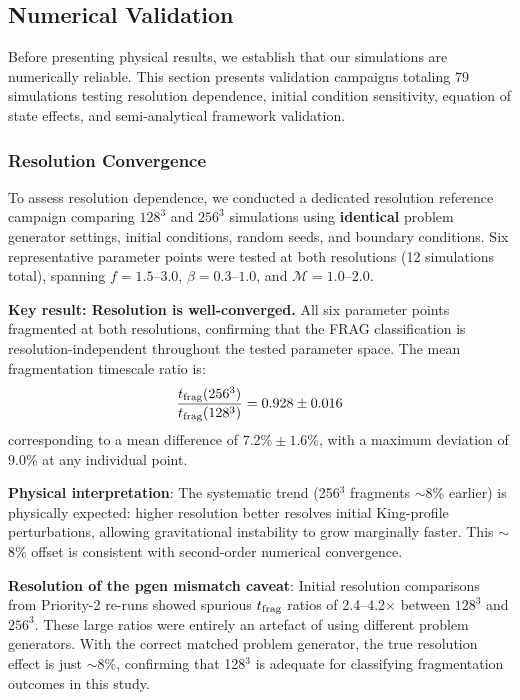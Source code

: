 \documentclass[twocolumn]{mnras}
\begin{document}
\subsection{Numerical Validation}
\label{sec:validation}

Before presenting physical results, we establish that our simulations are numerically reliable. This section presents validation campaigns totaling 79 simulations testing resolution dependence, initial condition sensitivity, equation of state effects, and semi-analytical framework validation.

\subsubsection{Resolution Convergence}

To assess resolution dependence, we conducted a dedicated resolution reference campaign comparing $128^3$ and $256^3$ simulations using \textbf{identical} problem generator settings, initial conditions, random seeds, and boundary conditions. Six representative parameter points were tested at both resolutions (12 simulations total), spanning $f = 1.5$--$3.0$, $\beta = 0.3$--$1.0$, and $\mathcal{M} = 1.0$--$2.0$.

\textbf{Key result: Resolution is well-converged.} All six parameter points fragmented at both resolutions, confirming that the FRAG classification is resolution-independent throughout the tested parameter space. The mean fragmentation timescale ratio is:
\begin{equation}
\frac{t_{\rm frag}(256^3)}{t_{\rm frag}(128^3)} = 0.928 \pm 0.016
\end{equation}
corresponding to a mean difference of $7.2\% \pm 1.6\%$, with a maximum deviation of $9.0\%$ at any individual point.

\textbf{Physical interpretation}: The systematic trend (256$^3$ fragments $\sim$8\% earlier) is physically expected: higher resolution better resolves initial King-profile perturbations, allowing gravitational instability to grow marginally faster. This $\sim$8\% offset is consistent with second-order numerical convergence.

\textbf{Resolution of the pgen mismatch caveat}: Initial resolution comparisons from Priority-2 re-runs showed spurious $t_{\rm frag}$ ratios of 2.4--4.2$\times$ between $128^3$ and $256^3$. These large ratios were entirely an artefact of using different problem generators. With the correct matched problem generator, the true resolution effect is just $\sim$8\%, confirming that 128$^3$ is adequate for classifying fragmentation outcomes in this study.
\end{document}
